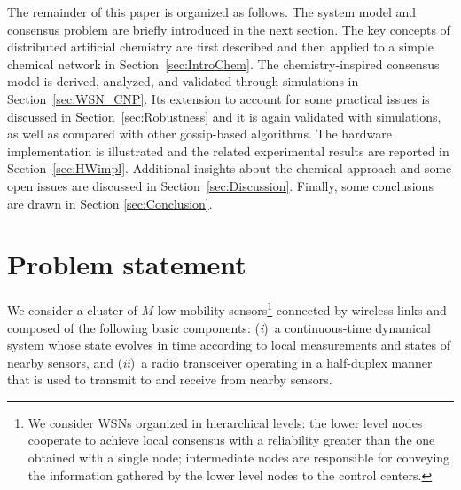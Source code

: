 \documentclass[journal]{IEEEtran}
\begin{document}
{The remainder of this paper is organized as follows. The system model and consensus problem are briefly introduced in the next section. The key concepts of distributed artificial chemistry are first described and then applied to a simple chemical network in Section~\ref{sec:IntroChem}. The chemistry-inspired consensus model is derived, analyzed, and validated through simulations in Section~\ref{sec:WSN_CNP}. Its extension to account for some practical issues is discussed in Section~\ref{sec:Robustness} and it is again validated with simulations, as well as compared with other gossip-based algorithms. The hardware implementation is illustrated and the related experimental results are reported in Section~\ref{sec:HWimpl}. Additional insights about the chemical approach and some open issues are discussed in Section~\ref{sec:Discussion}.
Finally, some conclusions are drawn in Section \ref{sec:Conclusion}.}

\section{Problem statement}\label{sec:probStatement}
{We consider a cluster of $M$ low-mobility sensors\footnote{{We consider WSNs organized in hierarchical levels: the lower level nodes cooperate to achieve local consensus with a reliability greater than the one obtained with a single node; intermediate nodes are responsible for conveying the information gathered by the lower level nodes to the control centers.}} connected by wireless links and composed of the following basic components:}
(\emph{i})~a continuous-time dynamical system whose state evolves
in time according to local measurements and states of
nearby sensors, and (\emph{ii})~a radio transceiver {operating in a half-duplex manner} that is used to transmit
to and receive from nearby sensors. 
\end{document}
